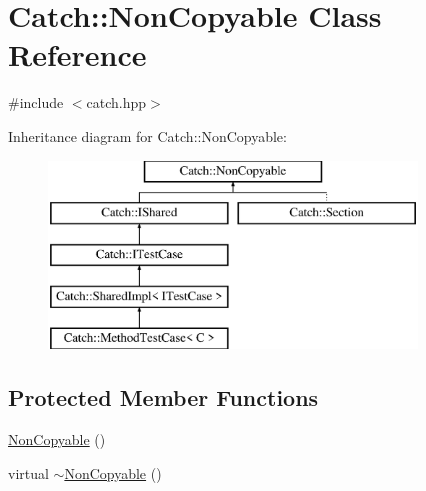 \hypertarget{classCatch_1_1NonCopyable}{\section{Catch\-:\-:Non\-Copyable Class Reference}
\label{classCatch_1_1NonCopyable}
}


{\ttfamily \#include $<$catch.\-hpp$>$}

Inheritance diagram for Catch\-:\-:Non\-Copyable\-:\begin{figure}[H]
\begin{center}
\leavevmode
\includegraphics[height=5.000000cm]{classCatch_1_1NonCopyable}
\end{center}
\end{figure}
\subsection*{Protected Member Functions}
\begin{DoxyCompactItemize}
\item 
\hyperlink{classCatch_1_1NonCopyable_a4b492dd5753f9952350fb64dc6cb9fe2}{Non\-Copyable} ()
\item 
virtual \hyperlink{classCatch_1_1NonCopyable_a81254677280fef337eb4a676e91e3293}{$\sim$\-Non\-Copyable} ()
\end{DoxyCompactItemize}


